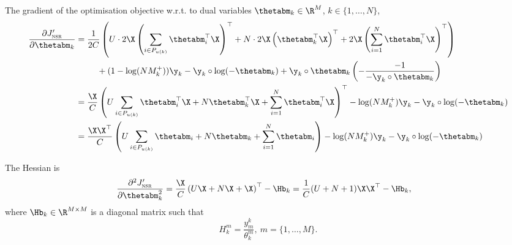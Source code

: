 The gradient of the optimisation objective w.r.t. to dual variables $\thetabm_k \in \R^{M}$, $k \in \{1,\dots,N\}$,
\begin{equation*}
\begin{aligned}
\frac{\partial J_\textsc{nsr}'}{\partial \thetabm_k}
&= \frac{1}{2 C} \left( U \cdot 2 \X \left(\sum_{i \in P_{u(k)}} \thetabm_i^\top \X \right)^\top 
   + N \cdot 2 \X \left( \thetabm_k^\top \X \right)^\top
   + 2 \X \left(\sum_{i=1}^N \thetabm_i^\top \X \right)^\top \right) \\
& \hspace{2.5em}
   + (1 - \log(N M_k^+)) \y_k - \y_k \circ \log(-\thetabm_k) + \y_k \circ \thetabm_k \left( -\frac{-1}{-\y_k \circ \thetabm_k} \right) \\
&= \frac{\X}{C} \left( U \sum_{i \in P_{u(k)}} \thetabm_i^\top \X 
   + N \thetabm_k^\top \X 
   + \sum_{i=1}^N \thetabm_i^\top \X \right)^\top
   - \log(N M_k^+) \y_k - \y_k \circ \log(-\thetabm_k) \\
&= \frac{\X \X^\top}{C} \left( U \sum_{i \in P_{u(k)}} \thetabm_i + N \thetabm_k + \sum_{i=1}^N \thetabm_i \right)
   - \log(N M_k^+) \y_k - \y_k \circ \log(-\thetabm_k) \\
\end{aligned}
\end{equation*}

The Hessian is
\begin{equation*}
\begin{aligned}
\frac{\partial^2 J_\textsc{nsr}'}{\partial \thetabm_k^2}
&= \frac{\X}{C} \left( U \X + N \X + \X \right)^\top - \Hb_k
 = \frac{1}{C} (U + N + 1) \X \X^\top - \Hb_k,
\end{aligned}
\end{equation*}
where $\Hb_k \in \R^{M \times M}$ is a diagonal matrix such that
\begin{equation*}
H_k^m = \frac{y_m^k}{\theta_k^m}, \ m = \{1,\dots,M\}.
\end{equation*}
